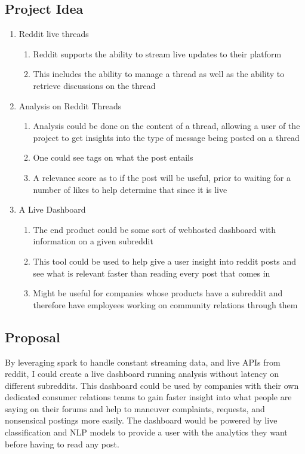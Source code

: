 \documentclass{article}
\begin{document}
\subsection{Project Idea}
\begin{enumerate}
    \item Reddit live threads
    \begin{enumerate}
        \item Reddit supports the ability to stream live updates to their platform
        \item This includes the ability to manage a thread as well as the ability to retrieve discussions on the thread
    \end{enumerate}
    \item Analysis on Reddit Threads
    \begin{enumerate}
        \item Analysis could be done on the content of a thread, allowing a user of the project to get insights into the type of message being posted on a thread
        \item One could see tags on what the post entails
        \item A relevance score as to if the post will be useful, prior to waiting for a number of likes to help determine that since it is live
    \end{enumerate}
    \item A Live Dashboard
    \begin{enumerate}
        \item The end product could be some sort of webhosted dashboard with information on a given subreddit
        \item This tool could be used to help give a user insight into reddit posts and see what is relevant faster than reading every post that comes in
        \item Might be useful for companies whose products have a subreddit and therefore have employees working on community relations through them
    \end{enumerate}
\end{enumerate}

\subsection{Proposal}
By leveraging spark to handle constant streaming data, and live APIs from reddit, I could create a live dashboard running analysis without latency on different subreddits. This dashboard could be used by companies with their own dedicated consumer relations teams to gain faster insight into what people are saying on their forums and help to maneuver complaints, requests, and nonsensical postings more easily. The dashboard would be powered by live classification and NLP models to provide a user with the analytics they want before having to read any post.
\end{document}
